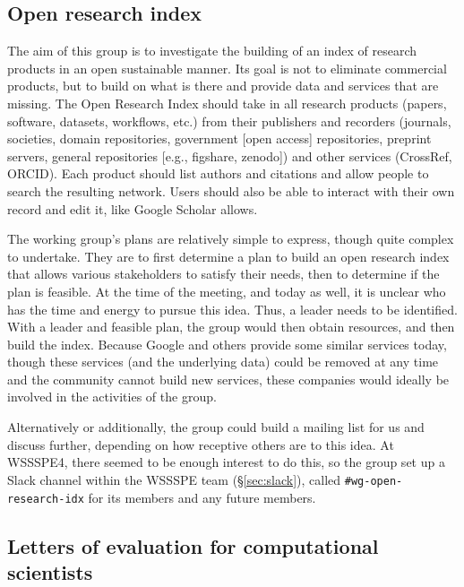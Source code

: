 \documentclass[11pt, oneside]{amsart}
\newcommand{\note}[1]{ {\textcolor{blueish}    { ***Note:      #1 }}}
\begin{document}
\subsection{Open research index}
\label{sec:open-research-index}


The aim of this group is to investigate the building of an index of research products in an open sustainable manner.  Its goal is not to eliminate commercial products, but to build on what is there and provide data and services that are missing.
%
The Open Research Index should take in all research products (papers, software, datasets, workflows, etc.) from their publishers and recorders (journals, societies, domain repositories, government [open access] repositories, preprint servers, general repositories [e.g., figshare, zenodo]) and other services (CrossRef, ORCID).
Each product should list authors and citations and allow people to search the resulting network.
Users should also be able to interact with their own record and edit it, like Google Scholar allows.

The working group's plans are relatively simple to express, though quite complex to undertake.  They are to first determine a plan to build an open research index that allows various stakeholders to satisfy their needs, then to determine if the plan is feasible.
At the time of the meeting, and today as well, it is unclear who has the time and energy to pursue this idea. Thus, a leader needs to be identified.
With a leader and feasible plan, the group would then obtain resources, and then build the index.
%
Because Google and others provide some similar services today, though these services (and the underlying data) could be removed at any time and the community cannot build new services, these companies would ideally be involved in the activities of the group.

Alternatively or additionally, the group could build a mailing list for us and discuss further, depending on how receptive others are to this idea.  At WSSSPE4, there seemed to be enough interest to do this, so the group set up a Slack channel within the WSSSPE team (\S\ref{sec:slack}), called \texttt{\#wg-open-research-idx} for its members and any future members.




\subsection{Letters of evaluation for computational scientists}
\label{sec:letters}
\end{document}
